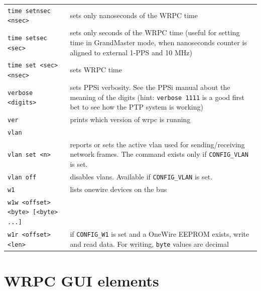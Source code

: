\documentclass[a4paper, 12pt]{article}
\newcommand{\code}[1]{\texttt{#1}}
\begin{document}
\begin{longtable}{  p{7.5cm}  p{7cm} }
  \code{time setnsec <nsec>} & sets only nanoseconds of the WRPC time \\

  \code{time setsec <sec>} & sets only seconds of the WRPC time (useful for
    setting time in GrandMaster mode, when nanoseconds counter is aligned to
    external 1-PPS and 10 MHz) \\

  \code{time set <sec> <nsec>} & sets WRPC time \\

  \code{verbose <digits>} & sets PPSi verbosity. See the PPSi manual about the
    meaning of the digits (hint: \texttt{verbose 1111} is a good first bet to
    see how the PTP system is working)  \\

  \code{ver} & prints which version of wrpc is running  \\

  \code{vlan} &  \\
  \code{vlan set <n>} & reports or sets the active vlan used for
    sending/receiving network frames. The command exists only if
    \texttt{CONFIG\_VLAN} is set.\\

  \code{vlan off} & disables vlans. Available if \texttt{CONFIG\_VLAN} is
    set. \\

  \code{w1} & lists onewire devices on the bus \\

  \code{w1w <offset> <byte> [<byte> ...]}&  \\

  \code{w1r <offset> <len>} & if \texttt{CONFIG\_W1} is set and a OneWire
    EEPROM exists, write and read data. For writing, \texttt{byte} values are
    decimal \\

\end{longtable}
\renewcommand\arraystretch{1}



\clearpage
\section{WRPC GUI elements}
\label{WRPC GUI elements}
\end{document}
